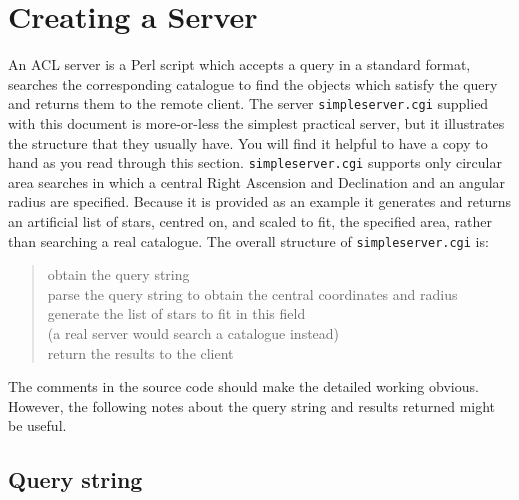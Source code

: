\documentclass[twoside,11pt,nolof,chapters]{starlink}
\begin{document}
\section{\label{SERVER_T}Creating a Server}

An ACL server is a Perl script which accepts a query in a standard format,
searches the corresponding catalogue to find the objects which satisfy
the query and returns them to the remote client.  The server \texttt{simpleserver.cgi} supplied with this document is more-or-less the simplest
practical server, but it illustrates the structure that they usually have.
You will find it helpful to have a copy to hand as you read through this
section.  \texttt{simpleserver.cgi} supports only circular area searches
in which a central Right Ascension and Declination and an angular radius
are specified.  Because it is provided as an example it generates and
returns an artificial list of stars, centred on, and scaled to fit, the
specified area, rather than searching a real catalogue.  The overall
structure of \texttt{simpleserver.cgi} is:

\begin{quote}
obtain the query string \\
parse the query string to obtain the central coordinates and radius \\
generate the list of stars to fit in this field \\
\hspace*{3 mm} (a real server would search a catalogue instead) \\
return the results to the client
\end{quote}

The comments in the source code should make the detailed working obvious.
However, the following notes about the query string and results returned
might be useful.

\subsection{Query string}
\end{document}
